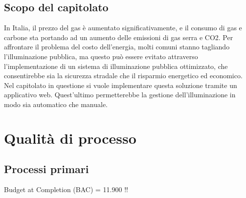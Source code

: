 \documentclass[12pt]{article}
\begin{document}
\subsection{Scopo del capitolato}
In Italia, il prezzo del gas è aumentato significativamente, e il consumo di gas e carbone sta portando ad un aumento delle emissioni di gas serra e CO2. Per affrontare il problema del costo dell'energia, molti comuni stanno tagliando l'illuminazione pubblica, ma questo può essere evitato attraverso l'implementazione di un sistema di illuminazione pubblica ottimizzato, che consentirebbe sia la sicurezza stradale che il risparmio energetico ed economico.
Nel capitolato in questione si vuole implementare questa soluzione tramite un applicativo web. Quest'ultimo permetterebbe la gestione dell'illuminazione in modo sia automatico che manuale.
\section{Qualità di processo}

\subsection{Processi primari}

 Budget at Completion (BAC) = 11.900 !!
\end{document}
